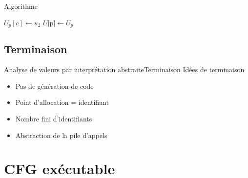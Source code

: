 \documentclass{beamer}
\begin{document}
\begin{frame}{Algorithme}
\begin{algorithm}[H]
{{{{                    $U_p[c] \gets u_2$ 
                    $U[$p$] \gets U_p$ 
        
                    \BlankLine
                     
                 }
              }{
              }
           }{
           }
        }
        \caption{Analyse du programme}
    \end{algorithm}
\end{frame}
\fi

\subsection{Terminaison}

\begin{frame}{Analyse de valeurs par interprétation abstraite}{Terminaison}
    Idées de terminaison

    \begin{itemize}
        \item Pas de génération de code
        \item Point d'allocation = identifiant
        \item Nombre fini d'identifiants
        \item Abstraction de la pile d'appels
    \end{itemize}
\end{frame}

\section{CFG exécutable}
\end{document}
